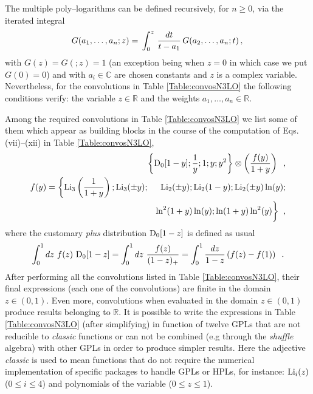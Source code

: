 \documentclass[12pt]{article}
\def\beq{\begin{equation}}
\def\eeq{\end{equation}}
\def\beeq{\begin{eqnarray}}
\def\eeeq{\end{eqnarray}}
\def\nn{\nonumber}
\newcommand\f[2]{\frac{#1}{#2}}
\newcommand{\rd}{d}
\begin{document}
The multiple poly--logarithms can be defined recursively, for $n\geq 0$, via the iterated integral~\cite{Goncharov:1998kja,Goncharov:2001iea}
 \beq\label{MultPolyLogdef}
 G(a_1,\ldots,a_n;z)=\,\int_0^z\,{\rd t\over t-a_1}\,G(a_2,\ldots,a_n;t)\,,\\
\eeq
with $G(z) = G(;z)=1$ (an exception being when $z=0$ in which case we put $G(0)=0$) and with $a_i\in \mathbb{C}$ are chosen constants and $z$ is a complex variable. Nevertheless, for the convolutions in Table \ref{Table:convosN3LO} the following conditions verify: the variable $z\in \mathbb{R}$ and the weights $a_1,\ldots,a_n \in \mathbb{R}$.

Among the required convolutions in Table \ref{Table:convosN3LO} we list some of them which appear as building blocks in the course of the computation of Eqs.  (vii)--(xii) in Table \ref{Table:convosN3LO},
\beeq
\!\!\!\!\!\!\!\!\!\!\!\!&&\!\!\!\!\!\!\!\!\!\!\!\!\!\!\!\!\!\!\!\!\!\!\!\!\!\!\!\!\!\!\!\!\!\!\!\!\!\!\!\!\!\!\!\!\!\!\!\!\bigg\{{\rm D}_{0}[1-y];\f{1}{y};1;y;y^{2}\bigg\} \otimes \left( \f{f(y)}{1+y} \right)\;\;,\\
f(y)=\bigg\{{\rm Li}_{3}\left(\f{1}{1+y}\right); {\rm Li}_{3}(\pm y);&&\!\!\!\!\!\!\!\!\!{\rm Li}_{2}(\pm y); {\rm Li}_{2}(1- y); {\rm Li}_{2}(\pm y) \ln(y);\nn\\
&&\ln^{2}(1+y)\ln(y);\ln(1+y)\ln^{2}(y)\bigg\}\;\;,
\eeeq
where the customary \textit{plus} distribution ${\rm D}_{0}[1-z]$ is defined as usual 
\beeq
\int^{1}_{0}dz~f(z)~{\rm D}_{0}[1-z] =\int^{1}_{0}dz~\f{f(z)}{(1-z)_{+}} = \int^{1}_{0}\f{dz}{1-z}\left( f(z)-f(1)\right)\;\;.
\eeeq
After performing all the convolutions listed in Table \ref{Table:convosN3LO}, their final expressions (each one of the convolutions) are finite in the domain $z\in (0,1)$. Even more, convolutions when evaluated in the domain $z\in (0,1)$ produce results belonging to $\mathbb{R}$. It is possible to write the expressions in Table \ref{Table:convosN3LO} (after simplifying) in function of twelve GPLs that are not reducible to \textit{classic} functions or can not be combined (e.g through the \textit{shuffle} algebra) with other GPLs in order to produce simpler results. Here the adjective  \textit{classic} is used to mean functions that do not require the numerical implementation of specific packages to handle GPLs or HPLs, for instance: ${\rm Li}_{i}(z)$ ($ 0 \leq i \leq 4$) and polynomials of the variable ($ 0 \leq z \leq 1$).
\end{document}
